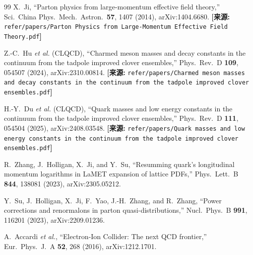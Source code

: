 \documentclass[12pt,a4paper]{ctexart}
\theoremstyle{definition}
\begin{document}
\begin{thebibliography}{99}
X.~Ji,
``Parton physics from large-momentum effective field theory,''
Sci.\ China Phys.\ Mech.\ Astron.\ \textbf{57}, 1407 (2014), arXiv:1404.6680.
\quad\textbf{[来源:} \texttt{refer/papers/Parton Physics from Large-Momentum Effective Field Theory.pdf}\textbf{]}


Z.-C.~Hu \textit{et al.} (CLQCD),
``Charmed meson masses and decay constants in the continuum from the tadpole improved clover ensembles,''
Phys.\ Rev.\ D \textbf{109}, 054507 (2024), arXiv:2310.00814.
\quad\textbf{[来源:} \texttt{refer/papers/Charmed meson masses and decay constants in the continuum from the tadpole improved clover ensembles.pdf}\textbf{]}

H.-Y.~Du \textit{et al.} (CLQCD),
``Quark masses and low energy constants in the continuum from the tadpole improved clover ensembles,''
Phys.\ Rev.\ D \textbf{111}, 054504 (2025), arXiv:2408.03548.
\quad\textbf{[来源:} \texttt{refer/papers/Quark masses and low energy constants in the continuum from the tadpole improved clover ensembles.pdf}\textbf{]}


R.~Zhang, J.~Holligan, X.~Ji, and Y.~Su,
``Resumming quark's longitudinal momentum logarithms in LaMET expansion of lattice PDFs,''
Phys.\ Lett.\ B \textbf{844}, 138081 (2023), arXiv:2305.05212.

Y.~Su, J.~Holligan, X.~Ji, F.~Yao, J.-H.~Zhang, and R.~Zhang,
``Power corrections and renormalons in parton quasi-distributions,''
Nucl.\ Phys.\ B \textbf{991}, 116201 (2023), arXiv:2209.01236.


A.~Accardi \textit{et al.},
``Electron-Ion Collider: The next QCD frontier,''
Eur.\ Phys.\ J.\ A \textbf{52}, 268 (2016), arXiv:1212.1701.

\end{thebibliography}
\end{document}
